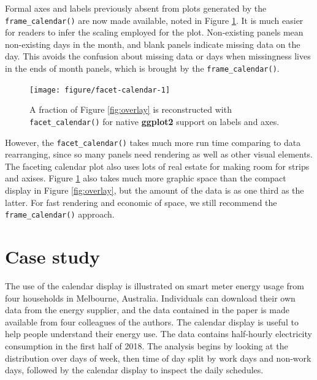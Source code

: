 \documentclass[12pt]{article}
\begin{document}
Formal axes and labels previously absent from plots generated by the \texttt{frame\_calendar()} are now made available, noted in Figure \ref{fig:facet-calendar}. It is much easier for readers to infer the scaling employed for the plot. Non-existing panels mean non-existing days in the month, and blank panels indicate missing data on the day. This avoids the confusion about missing data or days when missingness lives in the ends of month panels, which is brought by the \texttt{frame\_calendar()}.

\begin{figure}

{\centering \texttt{[image: figure/facet-calendar-1]} 

}

\caption{A fraction of Figure \ref{fig:overlay} is reconstructed with \texttt{facet\_calendar()} for native \textbf{ggplot2} support on labels and axes.}\label{fig:facet-calendar}
\end{figure}



However, the \texttt{facet\_calendar()} takes much more run time comparing to data rearranging, since so many panels need rendering as well as other visual elements. The faceting calendar plot also uses lots of real estate for making room for strips and axises. Figure \ref{fig:facet-calendar} also takes much more graphic space than the compact display in Figure \ref{fig:overlay}, but the amount of the data is as one third as the latter. For fast rendering and economic of space, we still recommend the \texttt{frame\_calendar()} approach.

\hypertarget{sec:case}{%
\section{Case study}\label{sec:case}}

The use of the calendar display is illustrated on smart meter energy usage from four households in Melbourne, Australia. Individuals can download their own data from the energy supplier, and the data contained in the paper is made available from four colleagues of the authors. The calendar display is useful to help people understand their energy use. The data contains half-hourly electricity consumption in the first half of 2018. The analysis begins by looking at the distribution over days of week, then time of day split by work days and non-work days, followed by the calendar display to inspect the daily schedules.
\end{document}
